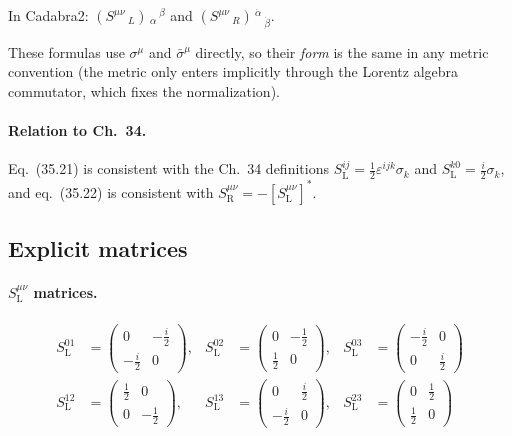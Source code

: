 \documentclass[12pt]{article}
\newcommand{\dal}{\dot\alpha}
\newcommand{\dbe}{\dot\beta}
\begin{document}
In Cadabra2:
$(S^{\mu \nu}\,_{L})\,_{\alpha}\,^{\beta}$
and
$(S^{\mu \nu}\,_{R})\,^{\dal}\,_{\dbe}$.

These formulas use $\sigma^\mu$ and $\bar\sigma^\mu$ directly, so their
\emph{form} is the same in any metric convention (the metric only enters
implicitly through the Lorentz algebra commutator, which fixes the
normalization).

\paragraph{Relation to Ch.~34.}
Eq.~(35.21) is consistent with the Ch.~34 definitions
$S^{ij}_{\mathrm{L}} = \tfrac{1}{2}\varepsilon^{ijk}\sigma_k$
and $S^{k0}_{\mathrm{L}} = \tfrac{i}{2}\sigma_k$,
and eq.~(35.22) is consistent with
$S^{\mu\nu}_{\mathrm{R}} = -[S^{\mu\nu}_{\mathrm{L}}]^*$.

\subsection{Explicit matrices}

\paragraph{\texorpdfstring{$S^{\mu\nu}_{\mathrm{L}}$}{SL} matrices.}
\begin{align*}
  S^{01}_{\mathrm{L}} &= \begin{pmatrix}0 & -\tfrac{i}{2} \\ -\tfrac{i}{2} & 0\end{pmatrix},&
  S^{02}_{\mathrm{L}} &= \begin{pmatrix}0 & -\tfrac{1}{2} \\ \tfrac{1}{2} & 0\end{pmatrix},&
  S^{03}_{\mathrm{L}} &= \begin{pmatrix}-\tfrac{i}{2} & 0 \\ 0 & \tfrac{i}{2}\end{pmatrix}\\[6pt]
  S^{12}_{\mathrm{L}} &= \begin{pmatrix}\tfrac{1}{2} & 0 \\ 0 & -\tfrac{1}{2}\end{pmatrix},&
  S^{13}_{\mathrm{L}} &= \begin{pmatrix}0 & \tfrac{i}{2} \\ -\tfrac{i}{2} & 0\end{pmatrix},&
  S^{23}_{\mathrm{L}} &= \begin{pmatrix}0 & \tfrac{1}{2} \\ \tfrac{1}{2} & 0\end{pmatrix}
\end{align*}
\end{document}
